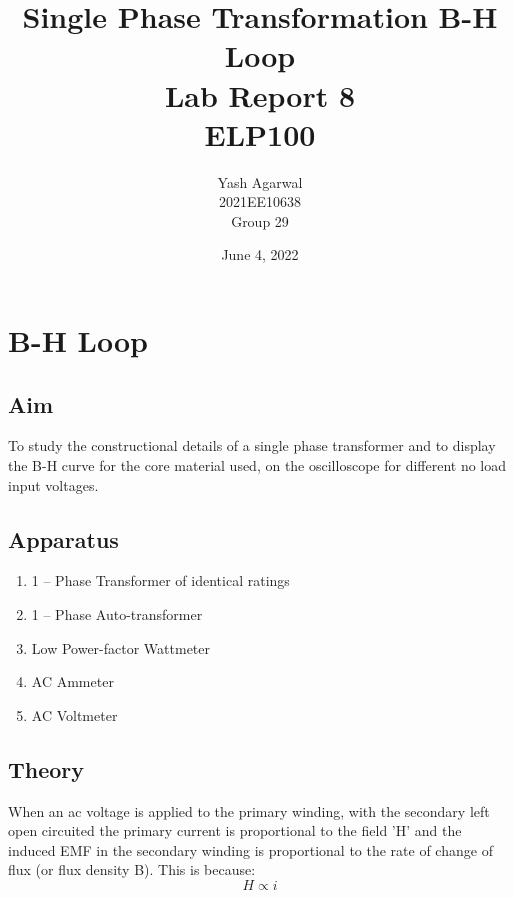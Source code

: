 \documentclass{article}
\title{Single Phase Transformation B-H Loop \\ Lab Report 8 \\ ELP100}
\author{Yash Agarwal \\ 2021EE10638 \\ Group 29}
\date{June 4, 2022}
\begin{document}
\pagecolor{yellow!15}
\maketitle
\vspace{15px}
\tableofcontents
{}
\newpage
\section{B-H Loop}
\subsection{Aim}
To study the constructional details of a single phase transformer and to display the B-H curve for the core material used, on the oscilloscope for different no load input voltages.

\subsection{Apparatus}
\begin{enumerate}
\item 1 – Phase Transformer of identical ratings
\item 1 – Phase Auto-transformer
\item Low Power-factor Wattmeter
\item AC Ammeter
\item AC Voltmeter

\end{enumerate}

\subsection{Theory}
\begin{center}
\end{center}

When an ac voltage is applied to the primary winding, with the secondary left open circuited the primary current is proportional to the field 'H' and the induced EMF in the secondary winding is proportional to the rate of change of flux (or flux density B). This
is because:
\[ H\propto i\]
\end{document}
